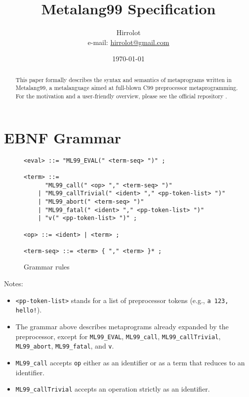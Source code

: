 \documentclass[12pt]{article}
\theoremstyle{break}
\begin{document}
\title{Metalang99 Specification}
\date{\today}
\author{Hirrolot \\ e-mail: \href{mailto:hirrolot@gmail.com}{hirrolot@gmail.com}}
\maketitle

\begin{abstract}
This paper formally describes the syntax and semantics of metaprograms written in Metalang99,
a metalanguage aimed at full-blown C99 preprocessor metaprogramming. For the motivation and
a user-friendly overview, please see the official repository \cite{Metalang99}.
\end{abstract}

\tableofcontents

\newpage

\section{EBNF Grammar}

\begin{figure}[H]
    \caption{Grammar rules}

\begin{verbatim}
<eval> ::= "ML99_EVAL(" <term-seq> ")" ;

<term> ::=
      "ML99_call(" <op> "," <term-seq> ")"
    | "ML99_callTrivial(" <ident> "," <pp-token-list> ")"
    | "ML99_abort(" <term-seq> ")"
    | "ML99_fatal(" <ident> "," <pp-token-list> ")"
    | "v(" <pp-token-list> ")" ;

<op> ::= <ident> | <term> ;

<term-seq> ::= <term> { "," <term> }* ;
\end{verbatim}

\end{figure}

Notes:

\begin{itemize}
    \item \texttt{<pp-token-list>} stands for a list of preprocessor tokens (e.g., \texttt{a 123, hello!}).
    \item The grammar above describes metaprograms already expanded by the preprocessor,
    except for \texttt{ML99\_EVAL}, \texttt{ML99\_call}, \texttt{ML99\_callTrivial},
    \texttt{ML99\_abort}, \texttt{ML99\_fatal}, and \texttt{v}.
    \item \texttt{ML99\_call} accepts \texttt{op} either as an identifier or as a term that
    reduces to an identifier.
    \item \texttt{ML99\_callTrivial} accepts an operation strictly as an identifier.
\end{itemize}
\end{document}
